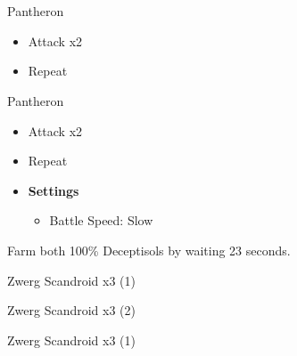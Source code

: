 \chapter[Chapter 2]{}

\begin{paracol}{2}

	\begin{battle}{Pantheron}
		\begin{itemize}
			\item Attack x2
			\item Repeat
		\end{itemize}
	\end{battle}
	
	\switchcolumn

\begin{battle}{Pantheron}
\begin{itemize}
    \item Attack x2
    \item Repeat
\end{itemize}
\end{battle}

\switchcolumn*
	\begin{menu}
		\begin{itemize}
			\item \textbf{Settings}
			      \begin{itemize}
				      \item Battle Speed: Slow
			      \end{itemize}
		\end{itemize}
	\end{menu}

	Farm both 100\% Deceptisols by waiting 23 seconds.
	\switchcolumn
	\switchcolumn*
	\begin{battle}{Zwerg Scandroid x3 (1)}
	\end{battle}

	\begin{battle}{Zwerg Scandroid x3 (2)}
	\end{battle}

	
\switchcolumn
\begin{battle}{Zwerg Scandroid x3 (1)}
\end{battle}


\end{paracol}
